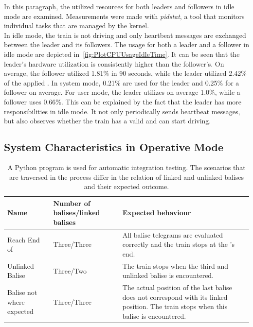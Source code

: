 In this paragraph, the utilized  resources for both leaders and followers in idle mode are examined.
Measurements were made with \textit{pidstat}, a tool that monitors individual tasks that are managed by the  kernel.
\\

In idle mode, the train is not driving and only heartbeat messages are exchanged between the leader and its followers.
The  usage for both a leader and a follower in idle mode are depicted in~\autoref{fig:PlotCPUUsageIdleTime}.
It can be seen that the leader's hardware utilization is consistently higher than the follower's.
On average, the follower utilized 1.81\% in 90 seconds, while the leader utilized 2.42\% of the applied .
In system mode, 0.21\% are used for the leader and 0.25\% for a follower on average.
For user mode, the leader utilizes on average 1.0\%, while a follower uses 0.66\%.
This can be explained by the fact that the leader has more responsibilities in idle mode.
It not only periodically sends heartbeat messages, but also observes whether the train has a valid  and can start driving.


\subsection{System Characteristics in Operative Mode}

\begin{table}[h!]
	\begin{center}
		\caption{A Python program is used for automatic integration testing. The scenarios that are traversed in the process differ in the relation of linked and unlinked balises and their expected outcome.}
		\label{tab:simulatedScenarios}
		\begin{tabularx}{\textwidth}{|X|X|X|}
			\hline
			\textbf{Name} & \textbf{Number of balises/linked balises} & \textbf{Expected behaviour}\\
			\hline \hline
			Reach End of \abr{MA} & Three/Three & All balise telegrams are evaluated correctly and the train stops at the \abr{MA}'s end. \\
			\hline
			Unlinked Balise & Three/Two & The train stops when the third and unlinked balise is encountered. \\
			\hline
			Balise not where expected & Three/Three & The actual position of the last balise does not correspond with its linked position. The train stops when this balise is encountered. \\
			\hline
		\end{tabularx}
	\end{center}
\end{table}

